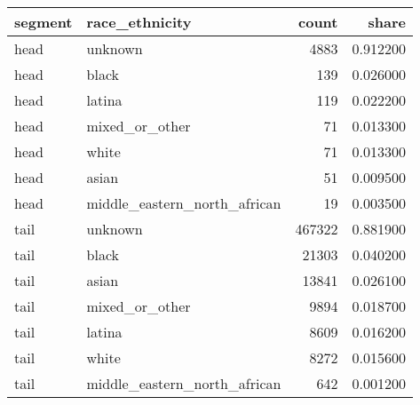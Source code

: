 \begin{tabular}{llrr}
\toprule
segment & race_ethnicity & count & share \\
\midrule
head & unknown & 4883 & 0.912200 \\
head & black & 139 & 0.026000 \\
head & latina & 119 & 0.022200 \\
head & mixed_or_other & 71 & 0.013300 \\
head & white & 71 & 0.013300 \\
head & asian & 51 & 0.009500 \\
head & middle_eastern_north_african & 19 & 0.003500 \\
tail & unknown & 467322 & 0.881900 \\
tail & black & 21303 & 0.040200 \\
tail & asian & 13841 & 0.026100 \\
tail & mixed_or_other & 9894 & 0.018700 \\
tail & latina & 8609 & 0.016200 \\
tail & white & 8272 & 0.015600 \\
tail & middle_eastern_north_african & 642 & 0.001200 \\
\bottomrule
\end{tabular}
